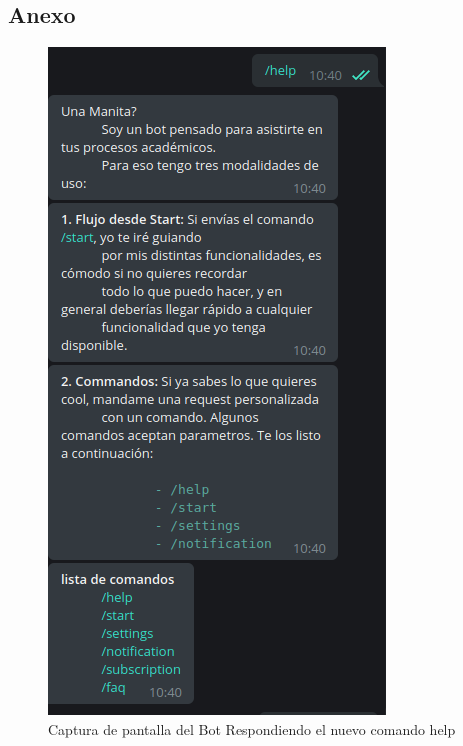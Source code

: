 \newpage
\begin{appendices}
    \chapter*{Anexo}
\end{appendices}

\begin{figure}[h]
    \centering
    \includegraphics[scale=0.5]{media/imagenes/sc/help.png}
    \caption[Bot help]{Captura de pantalla del Bot Respondiendo el nuevo comando help}
\end{figure}